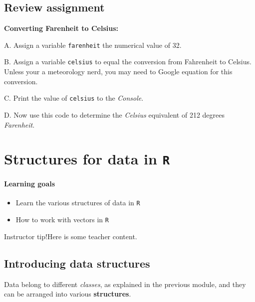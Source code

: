 \documentclass[
]{book}
\providecommand{\tightlist}{%
  \setlength{\itemsep}{0pt}\setlength{\parskip}{0pt}}
\begin{document}
\hypertarget{review-assignment-2}{%
\section*{Review assignment}\label{review-assignment-2}}

\textbf{Converting Farenheit to Celsius:}

A. Assign a variable \texttt{farenheit} the numerical value of 32.

B. Assign a variable \texttt{celsius} to equal the conversion from Fahrenheit to Celsius. Unless your a meteorology nerd, you may need to Google equation for this conversion.

C. Print the value of \texttt{celsius} to the \emph{Console}.

D. Now use this code to determine the \emph{Celsius} equivalent of 212 degrees \emph{Farenheit}.

\hypertarget{structures-for-data-in-r}{%
\chapter{\texorpdfstring{Structures for data in \texttt{R}}{Structures for data in R}}\label{structures-for-data-in-r}}

\hypertarget{learning-goals-3}{%
\subsubsection*{Learning goals}\label{learning-goals-3}}

\begin{itemize}
\tightlist
\item
  Learn the various structures of data in \texttt{R}\\
\item
  How to work with vectors in \texttt{R}
\end{itemize}

Instructor tip!Here is some teacher content.

\hypertarget{introducing-data-structures}{%
\section*{Introducing data structures}\label{introducing-data-structures}}

Data belong to different \emph{classes}, as explained in the previous module, and they can be arranged into various \textbf{structures}.
\end{document}
